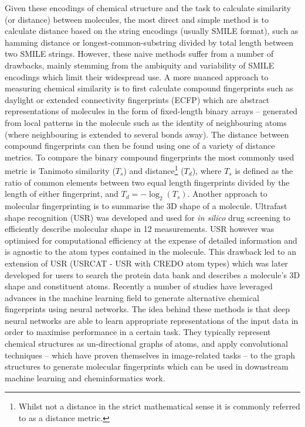\documentclass[a4paper,11pt,twoside,openright]{scrbook}
\begin{document}
Given these encodings of chemical structure and the task to calculate similarity (or distance) between molecules, the most direct and simple method is to calculate distance based on the string encodings (usually SMILE format), such as hamming distance or longest-common-substring divided by total length between two SMILE strings.\cite{Ozturk2016}
However, these naive methods  suffer from a number of drawbacks, mainly stemming from the ambiquity and variability of SMILE encodings which limit their widespread use. \cite{citation_needed}
A more nuanced approach to measuring chemical similarity is to first calculate  compound fingerprints such as daylight or extended connectivity fingerprints (ECFP) \cite{citation} which are abstract representations of molecules in the form of fixed-length binary arrays -- generated from local patterns in the molecule such as the identity of neighbouring atoms (where neighbouring is extended to several bonds away).
The distance between compound fingerprints can then be found using one of a variety of distance metrics.
To compare the binary compound fingerprints the most commonly used metric is Tanimoto similarity ($T_s$) and distance\footnote{Whilst not a distance in the  strict mathematical sense it is commonly referred to as a distance metric.} ($T_d$), where $T_s$ is defined as the ratio of common elements between two equal length fingerprints divided by the length of either fingerprint, and $T_d = -\log_2(T_s)$.
Another approach to molecular fingerprinting is to summarise the 3D shape of a molecule.
Ultrafast shape recognition (USR) was developed and used for \textit{in silico} drug screening to efficiently describe molecular shape in 12 measurements.
USR however was optimised for computational efficiency at the expense of detailed information and is agnostic to the atom types contained in the molecule.
This drawback led to an extension of USR (USRCAT - USR with CREDO atom types) which was later developed for users to search the protein data bank and describes a molecule's 3D shape and constituent atoms. \cite{Schreyer2012}
Recently a number of studies have leveraged advances in the machine learning field to generate alternative chemical fingerprints using neural networks. \cite{Kearnes2016a,Feinberg2018,Ma2018,Liu2018}
The idea behind these methods is that deep neural networks are able to learn appropriate representations of the input data in order to maximise performance in a certain task.
They typically represent chemical structures as un-directional graphs of atoms, and apply convolutional techniques -- which have proven themselves in image-related tasks -- to the graph structures to generate molecular fingerprints which can be used in downstream machine learning and cheminformatics work.
\end{document}
